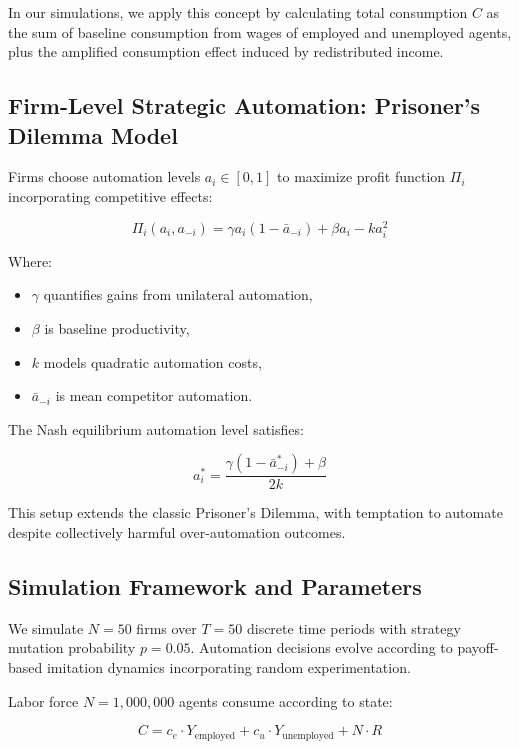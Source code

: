 \documentclass[10pt,a4paper]{article}
\begin{document}
In our simulations, we apply this concept by calculating total consumption \(C\) as the sum of baseline consumption from wages of employed and unemployed agents, plus the amplified consumption effect induced by redistributed income.

\subsection{Firm-Level Strategic Automation: Prisoner’s Dilemma Model}
Firms choose automation levels \(a_i \in [0,1]\) to maximize profit function \(\Pi_i\) incorporating competitive effects:

\begin{equation}
\Pi_i(a_i, a_{-i}) = \gamma a_i (1 - \bar{a}_{-i}) + \beta a_i - k a_i^2
\end{equation}

Where:
\begin{itemize}
    \item \(\gamma\) quantifies gains from unilateral automation,
    \item \(\beta\) is baseline productivity,
    \item \(k\) models quadratic automation costs,
    \item \(\bar{a}_{-i}\) is mean competitor automation.
\end{itemize}

The Nash equilibrium automation level satisfies:

\begin{equation}
a_i^* = \frac{\gamma (1 - \bar{a}_{-i}^*) + \beta}{2k}
\end{equation}

This setup extends the classic Prisoner’s Dilemma, with temptation to automate despite collectively harmful over-automation outcomes.

\subsection{Simulation Framework and Parameters}
We simulate \(N=50\) firms over \(T=50\) discrete time periods with strategy mutation probability \(p=0.05\). Automation decisions evolve according to payoff-based imitation dynamics incorporating random experimentation.

Labor force \(N=1,000,000\) agents consume according to state:

\begin{equation}
C = c_e \cdot Y_{\text{employed}} + c_u \cdot Y_{\text{unemployed}} + N \cdot R
\end{equation}
\end{document}
